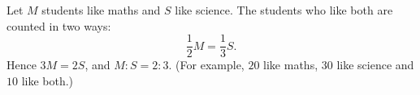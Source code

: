 Let $M$ students like maths and $S$ like science. The students who like both are counted in two ways:
\[\dfrac{1}{2}M=\dfrac{1}{3}S .\]
Hence $3M=2S$, and $M:S=\boxed{2:3}$. (For example, $20$ like maths, $30$ like science and $10$ like both.)
